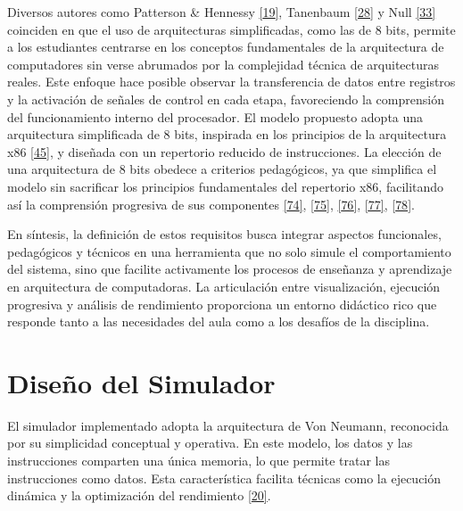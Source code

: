 \documentclass[12pt,oneside]{templates/unerthesis}
\begin{document}
Diversos autores como Patterson \& Hennessy \protect\hyperlink{ref-hennessy2017computer}{{[}19{]}}, Tanenbaum \protect\hyperlink{ref-tanenbaum_structured_2016}{{[}28{]}} y Null \protect\hyperlink{ref-null_essentials_2023}{{[}33{]}} coinciden en que el uso de arquitecturas simplificadas, como las de 8 bits, permite a los estudiantes centrarse en los conceptos fundamentales de la arquitectura de computadores sin verse abrumados por la complejidad técnica de arquitecturas reales. Este enfoque hace posible observar la transferencia de datos entre registros y la activación de señales de control en cada etapa, favoreciendo la comprensión del funcionamiento interno del procesador.
El modelo propuesto adopta una arquitectura simplificada de 8 bits, inspirada en los principios de la arquitectura x86 \protect\hyperlink{ref-intel_microarchitecture_2021}{{[}45{]}}, y diseñada con un repertorio reducido de instrucciones. La elección de una arquitectura de 8 bits obedece a criterios pedagógicos, ya que simplifica el modelo sin sacrificar los principios fundamentales del repertorio x86, facilitando así la comprensión progresiva de sus componentes \protect\hyperlink{ref-patt2019introduction}{{[}74{]}}, \protect\hyperlink{ref-majid1999design}{{[}75{]}}, \protect\hyperlink{ref-morlan_sap1_2021}{{[}76{]}}, \protect\hyperlink{ref-Guald_2015_thesis}{{[}77{]}}, \protect\hyperlink{ref-silber_tinycpu}{{[}78{]}}.

En síntesis, la definición de estos requisitos busca integrar aspectos funcionales, pedagógicos y técnicos en una herramienta que no solo simule el comportamiento del sistema, sino que facilite activamente los procesos de enseñanza y aprendizaje en arquitectura de computadoras. La articulación entre visualización, ejecución progresiva y análisis de rendimiento proporciona un entorno didáctico rico que responde tanto a las necesidades del aula como a los desafíos de la disciplina.

\hypertarget{diseuxf1o-del-simulador}{%
\section{Diseño del Simulador}\label{diseuxf1o-del-simulador}}

El simulador implementado adopta la arquitectura de Von Neumann, reconocida por su simplicidad conceptual y operativa. En este modelo, los datos y las instrucciones comparten una única memoria, lo que permite tratar las instrucciones como datos. Esta característica facilita técnicas como la ejecución dinámica y la optimización del rendimiento \protect\hyperlink{ref-stallings_computer_2021}{{[}20{]}}.
\end{document}
